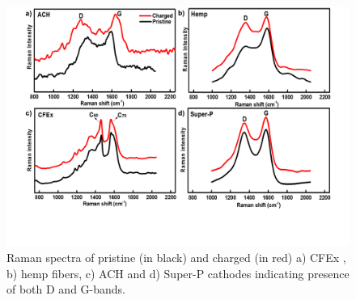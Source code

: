  \begin{figure}[tbh!]
  \centering
  \includegraphics[width=\textwidth]{Figures/chap5fig/Raman}
    \caption{Raman spectra of pristine (in black) and charged (in red) a) CFEx , b) hemp fibers, c) ACH and d) Super-P cathodes indicating presence of both D and G-bands.}
  \label{Figures/chap5fig:Raman}
\end{figure}

